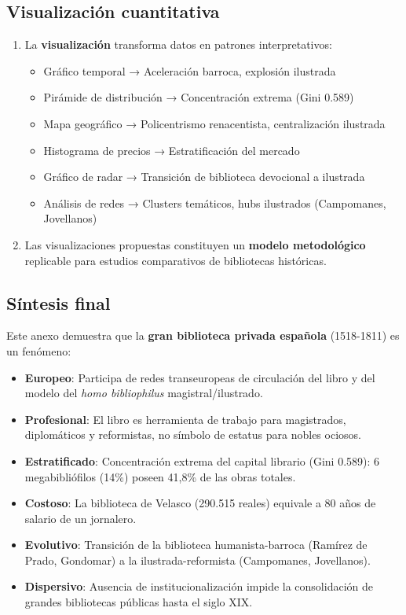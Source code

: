 \documentclass[11pt,a4paper]{article}
\begin{document}
\subsection{Visualización cuantitativa}

\begin{enumerate}
\item La \textbf{visualización} transforma datos en patrones interpretativos:
\begin{itemize}
\item Gráfico temporal → Aceleración barroca, explosión ilustrada
\item Pirámide de distribución → Concentración extrema (Gini 0.589)
\item Mapa geográfico → Policentrismo renacentista, centralización ilustrada
\item Histograma de precios → Estratificación del mercado
\item Gráfico de radar → Transición de biblioteca devocional a ilustrada
\item Análisis de redes → Clusters temáticos, hubs ilustrados (Campomanes, Jovellanos)
\end{itemize}

\item Las visualizaciones propuestas constituyen un \textbf{modelo metodológico} replicable para estudios comparativos de bibliotecas históricas.
\end{enumerate}

\subsection{Síntesis final}

Este anexo demuestra que la \textbf{gran biblioteca privada española} (1518-1811) es un fenómeno:

\begin{itemize}
\item \textbf{Europeo}: Participa de redes transeuropeas de circulación del libro y del modelo del \textit{homo bibliophilus} magistral/ilustrado.
\item \textbf{Profesional}: El libro es herramienta de trabajo para magistrados, diplomáticos y reformistas, no símbolo de estatus para nobles ociosos.
\item \textbf{Estratificado}: Concentración extrema del capital librario (Gini 0.589): 6 megabibliófilos (14\%) poseen 41,8\% de las obras totales.
\item \textbf{Costoso}: La biblioteca de Velasco (290.515 reales) equivale a 80 años de salario de un jornalero.
\item \textbf{Evolutivo}: Transición de la biblioteca humanista-barroca (Ramírez de Prado, Gondomar) a la ilustrada-reformista (Campomanes, Jovellanos).
\item \textbf{Dispersivo}: Ausencia de institucionalización impide la consolidación de grandes bibliotecas públicas hasta el siglo XIX.
\end{itemize}
\end{document}
